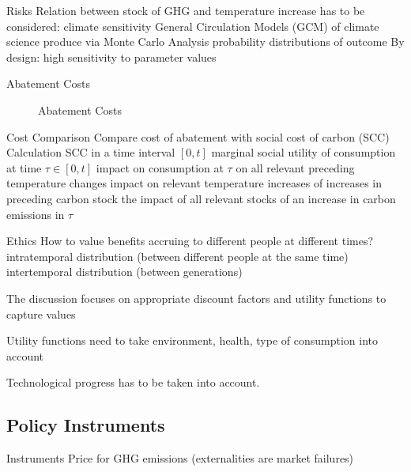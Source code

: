 Risks
	Relation between stock of GHG and temperature increase has to be considered: climate sensitivity
	General Circulation Models (GCM) of climate science produce via Monte Carlo Analysis probability distributions of outcome
	By design: high sensitivity to parameter values


Abatement Costs
\begin{center}
\begin{figure}[h!]
\centering
{} %
\caption{Abatement Costs}
\label{fig:abatement}
\end{figure}
\end{center}


Cost Comparison
	Compare cost of abatement with social cost of carbon (SCC)
	Calculation SCC in a time interval $[0,t]$
		marginal social utility of consumption at time $\tau \in [0,t]$
		impact on consumption at $\tau$ on all relevant preceding temperature changes
		impact on relevant temperature increases of increases in preceding carbon stock
		the impact of all relevant stocks of an increase in carbon emissions in $\tau$



Ethics
	How to value benefits accruing to different people at different times?
		intratemporal distribution (between different people at the same time)
		intertemporal distribution (between generations)

	The discussion focuses on appropriate discount factors and utility functions to capture values

	Utility functions need to take environment, health, type of consumption into account
	
	Technological progress has to be taken into account.



\subsection{Policy Instruments}


Instruments
	Price for GHG emissions (externalities are market failures)
	
